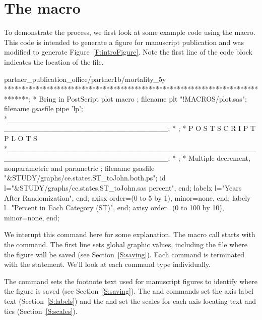 \documentclass[nojss]{jss}\usepackage[]{graphicx}\usepackage[]{color}
\begin{document}
\section[The plot.sas macro]{The  macro}\label{S:plot.sas}
To demonstrate the process, we first look at some example code using the  macro. This code is intended to generate a figure for manuscript publication and was modified to generate Figure~\ref{F:introFigure}. Note the first line of the code block indicates the location of the file.

\begin{CodeChunk}\small
\begin{CodeInput}
           partner_publication_office/partner1b/mortality_5y
*******************************************************************************;
* Bring in PostScript plot macro                                               ;
filename plt "!MACROS/plot.sas"; %
filename gsasfile pipe 'lp';
*______________________________________________________________________________;
*                                                                              ;
*                       P O S T S C R I P T   P L O T S
*______________________________________________________________________________;
*                                                                              ;
* Multiple decrement, nonparametric and parametric                             ;
filename gsasfile "&STUDY/graphs/ce.states.ST_toJohn.both.ps";
id l="&STUDY/graphs/ce.states.ST_toJohn.sas percent", end;
labelx l="Years After Randomization", end;
axisx order=(0 to 5 by 1), minor=none, end;
labely l="Percent in Each Category (ST)", end;
axisy order=(0 to 100 by 10), minor=none, end;
\end{CodeInput}
\end{CodeChunk}

We interupt this command here for some explanation. The  macro call starts with the  command. The first line sets global graphic values, including the file where the figure will be saved (see Section~\ref{S:saving}). Each  command is terminated with the  statement. We'll look at each command type individually.

The  command sets the footnote text used for manuscript figures to identify where the figure is saved (see Section~\ref{S:saving}). The  and  commands set the axis label text (Section~\ref{S:labels}) and the  and  set the scales for each axis locating text and tics (Section~\ref{S:scales}).
\end{document}
